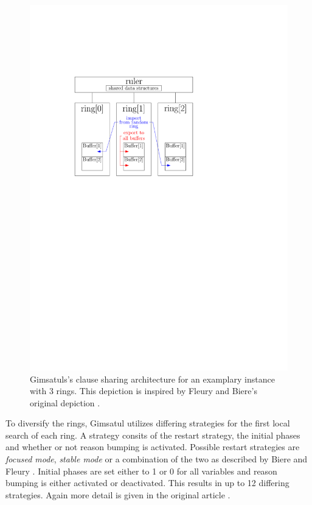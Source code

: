 \documentclass[12pt,a4paper,twoside]{scrartcl}
\numberwithin{equation}{section}
\begin{document}
\begin{figure}
  \center
  \includegraphics[]{figures/gimsatul_architecture.pdf}
  \caption{Gimsatuls's clause sharing architecture for an examplary instance with 3 rings. This depiction is inspired by Fleury and Biere's original depiction \cite{gimsatul}.}
  \label{fig:architectureGimsatul}
\end{figure}

To diversify the rings, Gimsatul utilizes differing strategies for the first local search of each ring. A strategy consits of the restart strategy, the initial phases and whether or not reason bumping is activated. Possible restart strategies are \textit{focused mode}, \textit{stable mode} or a combination of the two as described by Biere and Fleury \cite{restartStrategy}. Initial phases are set either to 1 or 0 for all variables and reason bumping is either activated or deactivated. This results in up to 12 differing strategies. Again more detail is given in the original article \cite{gimsatul}.
\end{document}

